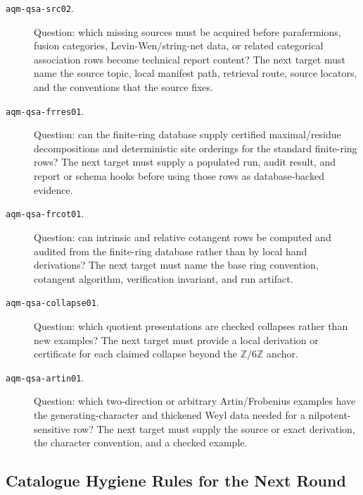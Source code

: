 \begin{description}
\item[\texttt{aqm-qsa-src02}.]
Question: which missing sources must be acquired before parafermions,
fusion categories, Levin-Wen/string-net data, or related categorical
association rows become technical report content?  The next target must name
the source topic, local manifest path, retrieval route, source locators, and
the conventions that the source fixes.
\item[\texttt{aqm-qsa-frres01}.]
Question: can the finite-ring database supply certified maximal/residue
decompositions and deterministic site orderings for the standard finite-ring
rows?  The next target must supply a populated run, audit result, and report
or schema hooks before using those rows as database-backed evidence.
\item[\texttt{aqm-qsa-frcot01}.]
Question: can intrinsic and relative cotangent rows be computed and audited
from the finite-ring database rather than by local hand derivations?  The
next target must name the base ring convention, cotangent algorithm,
verification invariant, and run artifact.
\item[\texttt{aqm-qsa-collapse01}.]
Question: which quotient presentations are checked collapses rather than
new examples?  The next target must provide a local derivation or certificate
for each claimed collapse beyond the \(\mathbb Z/6\mathbb Z\) anchor.
\item[\texttt{aqm-qsa-artin01}.]
Question: which two-direction or arbitrary Artin/Frobenius examples have the
generating-character and thickened Weyl data needed for a nilpotent-sensitive
row?  The next target must supply the source or exact derivation, the
character convention, and a checked example.
\end{description}

\subsection{Catalogue Hygiene Rules for the Next Round}

